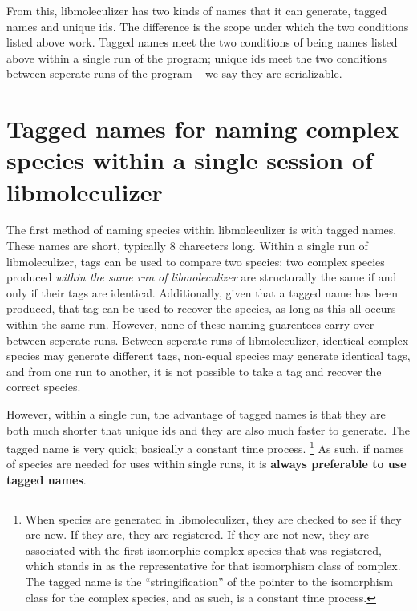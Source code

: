 From this, libmoleculizer has two kinds of names that it can
generate, tagged names and unique ids.  The difference is the scope
under which the two conditions listed above work.  Tagged names
meet the two conditions of being names listed above within a single
run of the program; unique ids meet the two conditions between
seperate runs of the program -- we say they are serializable.  


\section{Tagged names for naming complex species within a single session
  of libmoleculizer}

The first method of naming species within libmoleculizer is with
tagged names.  These names are short, typically 8 charecters long.
Within a single run of libmoleculizer, tags can be used to compare two
species: two complex species produced {\it within the same run of
  libmoleculizer} are structurally the same if and only if their tags
are identical.  Additionally, given that a tagged name has been
produced, that tag can be used to recover the species, as long as this
all occurs within the same run.  However, none of these naming
guarentees carry over between seperate runs.  Between seperate runs of
libmoleculizer, identical complex species may generate different tags,
non-equal species may generate identical tags, and from one run to
another, it is not possible to take a tag and recover the correct
species.  

However, within a single run, the advantage of tagged names is that
they are both much shorter that unique ids and they are also much
faster to generate.  The tagged name is very quick; basically a
constant time process. \footnote{When species are generated in
  libmoleculizer, they are checked to see if they are new.  If they
  are, they are registered.  If they are not new, they are associated
  with the first isomorphic complex species that was registered, which
  stands in as the representative for that isomorphism class of
  complex.  The tagged name is the ``stringification'' of the pointer
  to the isomorphism class for the complex species, and as such, is
  a constant time process.}  As such, if names of species are needed
for uses within single runs, it is \textbf{always preferable to use
  tagged names}.  


